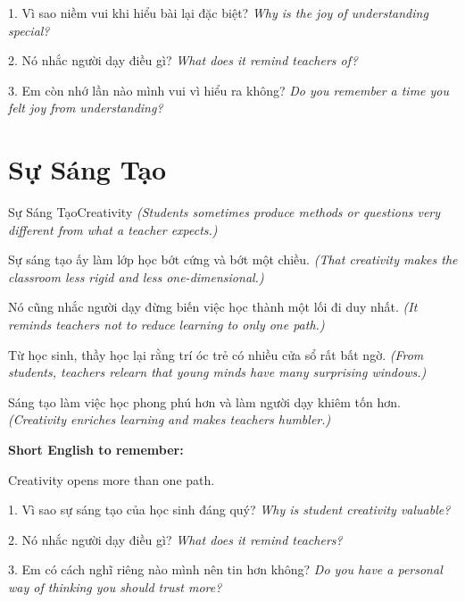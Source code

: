\begin{tuhocnhanh}
1. Vì sao niềm vui khi hiểu bài lại đặc biệt? \textit{Why is the joy of understanding special?}

2. Nó nhắc người dạy điều gì? \textit{What does it remind teachers of?}

3. Em còn nhớ lần nào mình vui vì hiểu ra không? \textit{Do you remember a time you felt joy from understanding?}
\end{tuhocnhanh}
\ngancach

\section{Sự Sáng Tạo}
\begin{truyen}{Sự Sáng Tạo}{Creativity}
\textit{(Students sometimes produce methods or questions very different from what a teacher expects.)}

Sự sáng tạo ấy làm lớp học bớt cứng và bớt một chiều.
\textit{(That creativity makes the classroom less rigid and less one-dimensional.)}

Nó cũng nhắc người dạy đừng biến việc học thành một lối đi duy nhất.
\textit{(It reminds teachers not to reduce learning to only one path.)}

Từ học sinh, thầy học lại rằng trí óc trẻ có nhiều cửa sổ rất bất ngờ.
\textit{(From students, teachers relearn that young minds have many surprising windows.)}
\end{truyen}

\begin{baihoc}
Sáng tạo làm việc học phong phú hơn và làm người dạy khiêm tốn hơn.
\textit{(Creativity enriches learning and makes teachers humbler.)}
\end{baihoc}

\begin{ghinhoanh}
\textbf{Short English to remember:}

Creativity opens more than one path.

\end{ghinhoanh}

\begin{tuhocnhanh}
1. Vì sao sự sáng tạo của học sinh đáng quý? \textit{Why is student creativity valuable?}

2. Nó nhắc người dạy điều gì? \textit{What does it remind teachers?}

3. Em có cách nghĩ riêng nào mình nên tin hơn không? \textit{Do you have a personal way of thinking you should trust more?}
\end{tuhocnhanh}
\ngancach


